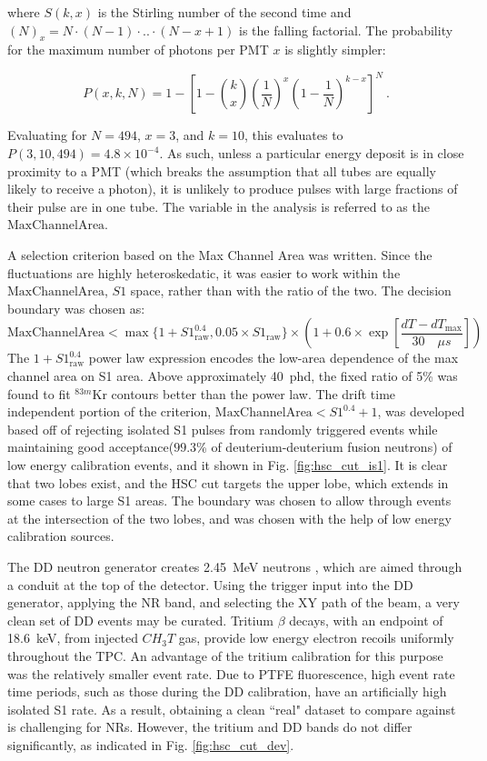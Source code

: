 where $S(k,x)$ is the Stirling number of the second time and $(N)_x=N\cdot(N-1)\cdot..\cdot(N-x+1)$ is the falling factorial.
The probability for the maximum number of photons per PMT $x$ is slightly simpler:

\begin{equation}
    P(x,k,N) = 1- [1- \genfrac(){0pt}{}{k}{x} (\frac{1}{N})^x (1- \frac{1}{N})^{k-x}]^N~.
\end{equation}

Evaluating for $N=494$, $x=3$, and $k=10$, this evaluates to $P(3,10, 494) = 4.8\times10^{-4}$.
As such, unless a particular energy deposit is in close proximity to a PMT (which breaks the assumption that all tubes are equally likely to receive a photon), it is unlikely to produce pulses with large fractions of their pulse are in one tube.
The variable in the analysis is referred to as the $\mathrm{MaxChannelArea}$.

A selection criterion based on the Max Channel Area was written.
Since the fluctuations are highly heteroskedatic, it was easier to work within the $\text{MaxChannelArea}$, $S1$ space, rather than with the ratio of the two.
The decision boundary was chosen as:
\begin{equation}
    \text{MaxChannelArea}  < \max\{1+ S1_{\text{raw}}^{0.4}, 0.05 \times S1_{\text{raw}}\}\times  (1+ 0.6 \times \exp[\frac{dT - dT_{\text{max}}}{30 \quad \mu s}] ) 
    \label{eq:hsc_cut_def}
\end{equation}
\noindent
The $1+ S1_{\text{raw}}^{0.4}$ power law expression encodes the low-area dependence of the max channel area on S1 area.
Above approximately 40~phd, the fixed ratio of 5\% was found to fit $^{83m}$Kr contours better than the power law.
The drift time independent portion of the criterion, $\text{MaxChannelArea} < S1^{0.4}+1$, was developed based off of rejecting isolated S1 pulses from randomly triggered events while maintaining good acceptance($99.3$\% of deuterium-deuterium fusion neutrons) of low energy calibration events, and it shown in Fig. \ref{fig:hsc_cut_is1}.
It is clear that two lobes exist, and the HSC cut targets the upper lobe, which extends in some cases to large S1 areas.
The boundary was chosen to allow through events at the intersection of the two lobes, and was chosen with the help of low energy calibration sources.

The DD neutron generator creates 2.45~MeV neutrons \cite{stott_advances_1997}, which are aimed through a conduit at the top of the detector.
Using the trigger input into the DD generator, applying the NR band, and selecting the XY path of the beam, a very clean set of DD events may be curated.
Tritium $\beta$ decays, with an endpoint of 18.6~keV, from injected $CH_3T$ gas, provide low energy electron recoils uniformly throughout the TPC.
An advantage of the tritium calibration for this purpose was the relatively smaller event rate.
Due to PTFE fluorescence, high event rate time periods, such as those during the DD calibration, have an artificially high isolated S1 rate.
As a result, obtaining a clean ``real" dataset to compare against is challenging for NRs.
However, the tritium and DD bands do not differ significantly, as indicated in Fig. \ref{fig:hsc_cut_dev}.

